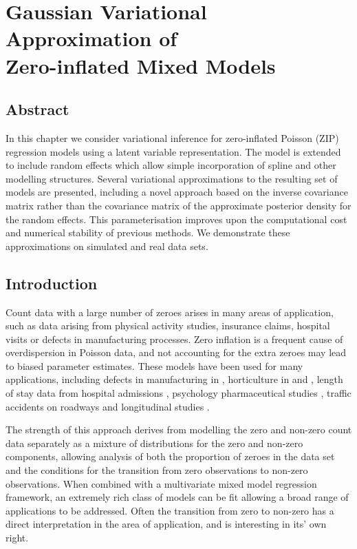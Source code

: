 \chapter[Gaussian Variational Approximation of Zero-inflated GLMMs]{Gaussian
Variational Approximation of \\ Zero-inflated Mixed Models}

\section*{Abstract}


In this chapter we consider variational inference for zero-inflated Poisson (ZIP)
regression models using a latent variable representation. The model is
extended to include random effects which allow simple incorporation of
spline and other modelling structures. Several variational approximations
to the resulting set of models are presented, including a novel approach
based on the inverse covariance matrix rather than the covariance matrix of
the approximate posterior density for the random effects. This
parameterisation improves upon the computational cost and numerical
stability of previous methods. We demonstrate these approximations on
simulated and real data sets.

\newpage 

\section{Introduction}
\label{sec:introduction}


Count data with a large number of zeroes arises in many areas of application,
such as data arising from physical activity studies, insurance claims, hospital
visits or defects in manufacturing processes. Zero inflation is a frequent
cause of overdispersion in Poisson data, and not accounting for the extra
zeroes may lead to biased parameter estimates. These models have been used for
many applications, including defects in manufacturing in \cite{lambert1992},
horticulture in \cite{BIOM:BIOM1030} and \cite{BIOM:BIOM1030}, length of stay
data from hospital admissions  \citep{BIMJ:BIMJ200390024}, psychology 
pharmaceutical studies  \citep{Min01042005}, traffic
accidents on roadways  \citep{Shankar1997829} and longitudinal studies 
\citep{LeeWangScottYauMcLachlan2006}.

The strength of this approach derives from modelling the zero and non-zero
count data separately as a mixture of distributions for the zero and non-zero
components, allowing analysis of both the proportion of zeroes in the data set
and the conditions for the transition from zero observations to non-zero
observations. When combined with a multivariate mixed model regression
framework, an extremely rich class of models can be fit allowing a broad range
of applications to be addressed. Often the transition from zero to non-zero has
a direct interpretation in the area of application, and is interesting in its'
own right.

